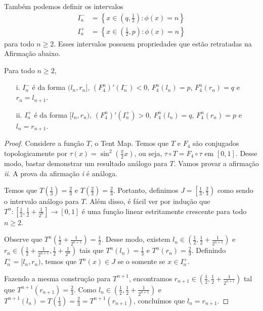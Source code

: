 Também podemos definir os intervalos
\begin{align*}
I^-_n & = \left \{ x \in \left ( q, \frac{1}{2} \right ) : \phi(x) = n \right \}\\
I^+_n & = \left \{ x \in \left ( \frac{1}{2}, p \right ) : \phi(x) = n \right \}
\end{align*}
para todo $n \geq 2$. Esses intervalos possuem propriedades que estão retratadas na Afirmação abaixo.

\begin{affirmation}
Para todo $n \geq 2$,
\begin{enumerate}
\item[i.] $I^-_n$ é da forma $(l_n, r_n]$, $(F_4^n)'(I^-_n) < 0$, $F_4^n(l_n) = p$, $F_4^n(r_n) = q$ e $r_n = l_{n+1}$.
\item[ii.] $I^+_n$ é da forma $[l_n, r_n)$, $(F_4^n)'(I^+_n) > 0$, $F_4^n(l_n) = q$, $F_4^n(r_n) = p$ e $l_n = r_{n+1}$.
\end{enumerate}
\end{affirmation}

\begin{proof}
Considere a função $T$, o Tent Map. Temos que $T$ e $F_4$ são conjugados topologicamente por $\tau(x) = \sin^2 \left( \frac{\pi}{2} x \right)$, ou seja, $\tau \circ T = F_4 \circ \tau$ em $[0, 1]$. Desse modo, bastar demonstrar um resultado análogo para $T$. Vamos provar a afirmação \textit{ii}. A prova da afirmação \textit{i} é análoga.

Temos que $T\left( \frac{1}{3} \right) = \frac{2}{3}$ e $T\left( \frac{2}{3} \right) = \frac{2}{3}$. Portanto, definimos $J = \left[ \frac{1}{3}, \frac{2}{3} \right)$ como sendo o intervalo análogo para $T$. Além disso, é fácil ver por indução que $T^n: \left[ \frac{1}{2}, \frac{1}{2} + \frac{1}{2^n} \right] \to [0, 1]$ é uma função linear estritamente crescente para todo $n \geq 2$.

Observe que $T^n\left( \frac{1}{2} + \frac{1}{2^{n+1}}\right) = \frac{1}{2}$. Desse modo, existem $l_n \in \left(\frac{1}{2}, \frac{1}{2} + \frac{1}{2^{n+1}}\right)$ e $r_n \in \left(\frac{1}{2} + \frac{1}{2^{n+1}}, \frac{1}{2} + \frac{1}{2^n} \right)$ tais que $T^n(l_n) = \frac{1}{3}$ e $T^n(r_n) = \frac{2}{3}$. Definindo $I^+_n = [l_n, r_n)$, temos que $T^n(x) \in J$ se o somente se $x \in I^+_n$.

Fazendo a mesma construção para $T^{n+1}$, encontramos $r_{n+1} \in \left(\frac{1}{2}, \frac{1}{2} + \frac{1}{2^{n+1}}\right)$ tal que $T^{n+1}(r_{n+1}) = \frac{2}{3}$. Como $l_n \in \left(\frac{1}{2}, \frac{1}{2} + \frac{1}{2^{n+1}}\right)$ e $T^{n+1}(l_n) = T\left(\frac{1}{3}\right) = \frac{2}{3} = T^{n+1}(r_{n+1})$, concluímos que $l_n = r_{n+1}$.
\end{proof}



